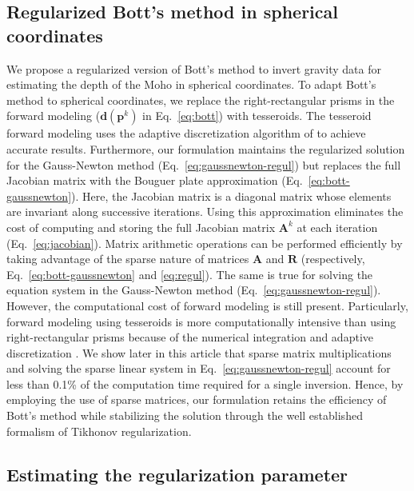 \documentclass[extra,mreferee]{gji}
\begin{document}
\subsection{Regularized Bott's method in spherical coordinates}

We propose a regularized version of Bott's method to invert gravity data for
estimating the depth of the Moho in spherical coordinates.
To adapt Bott's method to spherical coordinates,
we replace the right-rectangular prisms in the forward modeling
($\mathbf{d}(\mathbf{p}^k)$ in Eq.~\ref{eq:bott})
with tesseroids.
The tesseroid forward modeling uses the adaptive discretization algorithm
of \citet{uieda2016} to achieve accurate results.
Furthermore, our formulation maintains the regularized solution
for the Gauss-Newton method (Eq.~\ref{eq:gaussnewton-regul})
but replaces the full Jacobian matrix with the Bouguer plate approximation
(Eq.~\ref{eq:bott-gaussnewton}).
Here, the Jacobian matrix is a diagonal matrix whose elements are invariant
along successive iterations.
Using this approximation eliminates the cost of computing and storing
the full Jacobian matrix $\mathbf{A}^k$ at each iteration
(Eq.~\ref{eq:jacobian}).
Matrix arithmetic operations can be performed efficiently by taking advantage
of the sparse nature of matrices $\mathbf{A}$ and $\mathbf{R}$
(respectively, Eq.~\ref{eq:bott-gaussnewton} and \ref{eq:regul}).
The same is true for solving the equation system in the Gauss-Newton method
(Eq.~\ref{eq:gaussnewton-regul}).
However, the computational cost of forward modeling is still present.
Particularly, forward modeling using tesseroids is more computationally
intensive than using right-rectangular prisms
because of the numerical integration and adaptive discretization
\citep{uieda2016}.
We show later in this article that sparse matrix multiplications and solving
the sparse linear system in Eq.~\ref{eq:gaussnewton-regul} account for less
than 0.1\% of the computation time required for a single inversion.
Hence, by employing the use of sparse matrices, our formulation retains the
efficiency of Bott's method while stabilizing the solution through the well
established formalism of Tikhonov regularization.



\subsection{Estimating the regularization parameter}
\end{document}
